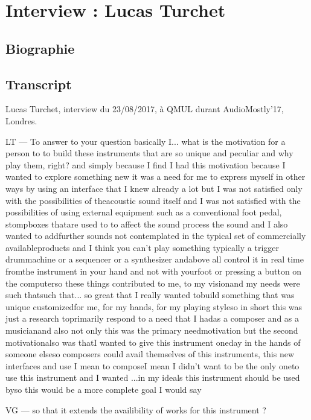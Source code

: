 \chapter{Interview : Lucas Turchet}
\label{appendix:turchet}

\section*{Biographie}

\section*{Transcript}

Lucas Turchet, interview du 23/08/2017, à QMUL durant AudioMostly'17, Londres.

LT — To answer to your question basically I...  what is the motivation for a person to to build these instruments that are so unique and peculiar and why play them, right? and simply because I find I had this motivation because I wanted to explore something new it was a need for me to express myself in other ways by using an interface  that I knew already a lot but I was not satisfied only with the possibilities of theacoustic sound itself and I was not satisfied with the possibilities of using external equipment such as a conventional foot pedal, stompboxes thatare used to to affect the sound process the sound and I also wanted to addfurther sounds not contemplated in the typical set of commercially availableproducts and I think you can't play something typically a trigger drummachine or a sequencer or a synthesizer andabove all control it in real time fromthe instrument in your hand and not with yourfoot or pressing a button on the computerso these things contributed to me, to my visionand my needs were such thatsuch that... so great that I really wanted tobuild something that was unique customizedfor me, for my hands, for my playing styleso in short this was just a research toprimarily respond to a need that I hadas a composer and as a musicianand also not only this was the primary needmotivation but the second motivationalso was thatI wanted to give this instrument oneday in the hands of someone elseso composers could avail themselves of this instruments, this new interfaces and use I mean to composeI mean I didn't want to be the only oneto use this instrument and I wanted ...in my ideals this instrument should be used byso this would be a more complete goal I would say

VG — so that it extends the availibility of works for this instrument ?

